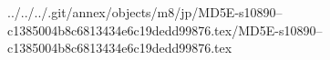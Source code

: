 ../../../.git/annex/objects/m8/jp/MD5E-s10890--c1385004b8c6813434e6c19dedd99876.tex/MD5E-s10890--c1385004b8c6813434e6c19dedd99876.tex